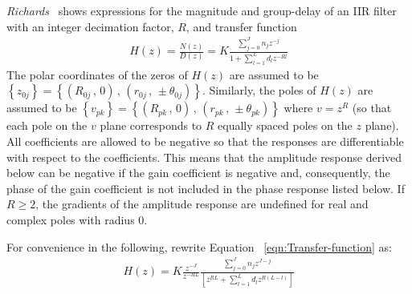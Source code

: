 \documentclass[a4paper,twoside,10pt,english]{report}
\begin{document}
\begin{raggedbottom}
\emph{Richards}~\cite{Richards_DeczkyRecursiveDecimator} shows expressions
for the magnitude and group-delay of an IIR filter with an integer
decimation factor, $R$, and transfer function 
\begin{align}
\label{eqn:Transfer-function}
H\left(z\right) = \frac{N\left(z\right)}{D\left(z\right)} =
 K\frac{\sum_{j=0}^{J}n_{j}z^{-j}}{1+\sum_{l=1}^{L}d_{l}z^{-Rl}}
\end{align}
The polar coordinates of the zeros of $H\left(z\right)$ are assumed to be 
$\left\{ z_{0j}\right\} =\left\{ \left(R_{0j}\,,\,0\right)\,,\,\left(r_{0j}\,,\,\pm\theta_{0j}\right)\right\}$. Similarly, the poles of $H\left(z\right)$ are 
assumed to be $\left\{v_{pk}\right\} =\left\{\left(R_{pk}\,,\,0\right)\,,\,\left(r_{pk}\,,\,\pm\theta_{pk}\right)\right\}$ where $v=z^{R}$ (so that each pole 
on the $v$ plane corresponds to $R$ equally spaced poles on the $z$ plane). All 
coefficients are allowed to be negative so that the responses are differentiable
with respect to the coefficients. This means that the amplitude response derived
below can be negative if the gain coefficient is negative and, consequently,
the phase of the gain coefficient is not included in the phase response listed
below. If $R\ge{}2$, the gradients of the amplitude response are undefined for
real and complex poles with radius $0$.

For convenience in the following, rewrite Equation~
\ref{eqn:Transfer-function} as:
\begin{align*}
\label{eqn:Transfer-function-with-delay}
H\left(z\right) = K\frac{z^{-J}}{z^{-RL}} 
\frac{\sum_{j=0}^{J}n_{j}z^{J-j}}
{\left[z^{RL}+\sum_{l=1}^{L}d_{l}z^{R\left(L-l\right)}\right]}
\end{align*}


\end{raggedbottom}
\end{document}
